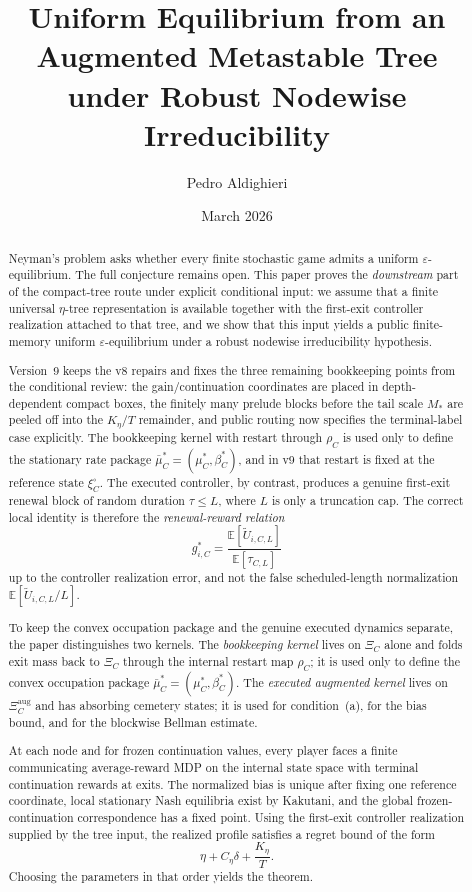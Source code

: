 \documentclass[12pt]{article}
\title{\textbf{Uniform Equilibrium from an Augmented Metastable Tree\\under Robust Nodewise Irreducibility}}
\author{Pedro Aldighieri}
\date{March 2026}
\theoremstyle{definition}
\newcommand{\eps}{\varepsilon}
\newcommand{\E}{\mathbb{E}}
\newcommand{\1}{\mathbf{1}}
\begin{document}
\maketitle



\begin{abstract}
Neyman's problem asks whether every finite stochastic game admits a uniform
$\eps$-equilibrium. The full conjecture remains open. This paper proves the
\emph{downstream} part of the compact-tree route under explicit conditional input:
we assume that a finite universal $\eta$-tree representation is available together
with the first-exit controller realization attached to that tree, and we show that
this input yields a public finite-memory uniform $\eps$-equilibrium under a robust
nodewise irreducibility hypothesis.

Version~9 keeps the v8 repairs and fixes the three remaining bookkeeping
points from the conditional review: the gain/continuation coordinates are placed
in depth-dependent compact boxes, the finitely many prelude blocks before the
tail scale $M_*$ are peeled off into the $K_\eta/T$ remainder, and public
routing now specifies the terminal-label case explicitly. The bookkeeping kernel
with restart through $\rho_C$ is used only to define the stationary rate package
$\bar\mu_C^*=(\mu_C^*,\beta_C^*)$, and in v9 that restart is fixed at the
reference state $\xi_C^\circ$. The executed controller, by contrast, produces a
genuine first-exit renewal block of random duration $\tau\le L$, where $L$ is
only a truncation cap. The correct local identity is therefore the
\emph{renewal-reward relation}
\[
g_{i,C}^*
=
\frac{\E[\widetilde U_{i,C,L}]}{\E[\tau_{C,L}]}
\]
up to the controller realization error, and not the false scheduled-length
normalization $\E[\widetilde U_{i,C,L}/L]$.

To keep the convex occupation package and the genuine executed dynamics separate,
the paper distinguishes two kernels. The \emph{bookkeeping kernel} lives on
$\Xi_C$ alone and folds exit mass back to $\Xi_C$ through the internal restart map
$\rho_C$; it is used only to define the convex occupation package
$\bar\mu_C^*=(\mu_C^*,\beta_C^*)$. The \emph{executed augmented kernel} lives on
$\Xi_C^{\mathrm{aug}}$ and has absorbing cemetery states; it is used for
condition~\textnormal{(a)}, for the bias bound, and for the blockwise Bellman
estimate.

At each node and for frozen continuation values, every player faces a finite
communicating average-reward MDP on the internal state space with terminal
continuation rewards at exits. The normalized bias is unique after fixing one
reference coordinate, local stationary Nash equilibria exist by Kakutani, and the
global frozen-continuation correspondence has a fixed point. Using the first-exit
controller realization supplied by the tree input, the realized profile satisfies a
regret bound of the form
\[
\eta + C_\eta\delta + \frac{K_\eta}{T}.
\]
Choosing the parameters in that order yields the theorem.
\end{abstract}
\end{document}
